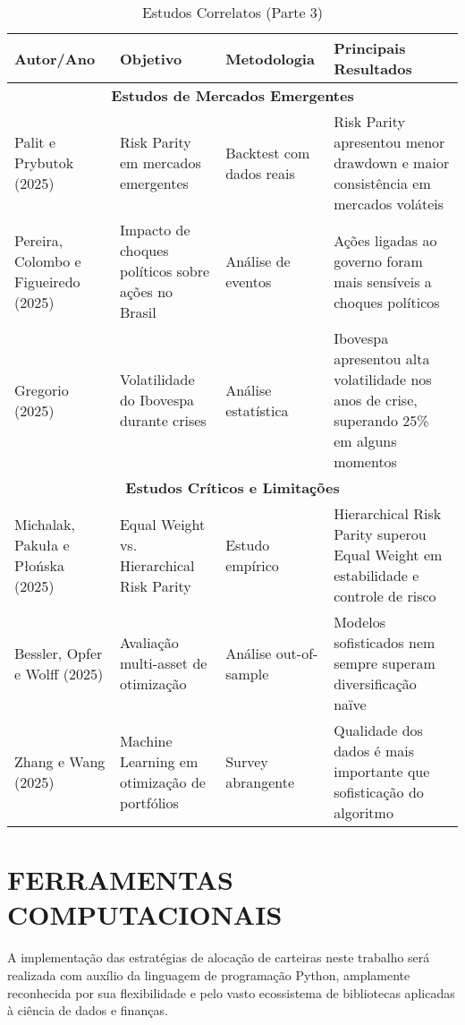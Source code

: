 \begin{table}[H]
\centering
\caption{Estudos Correlatos (Parte 3)}
\begin{tabular}{|p{2.3cm}|p{3.2cm}|p{2.6cm}|p{3.2cm}|}
\hline
\textbf{Autor/Ano} & \textbf{Objetivo} & \textbf{Metodologia} & \textbf{Principais Resultados} \\
\hline
\multicolumn{4}{|c|}{\textbf{Estudos de Mercados Emergentes}} \\
\hline
Palit e Prybutok (2025) & Risk Parity em mercados emergentes & Backtest com dados reais & Risk Parity apresentou menor drawdown e maior consistência em mercados voláteis \\
\hline
Pereira, Colombo e Figueiredo (2025) & Impacto de choques políticos sobre ações no Brasil & Análise de eventos & Ações ligadas ao governo foram mais sensíveis a choques políticos \\
\hline
Gregorio (2025) & Volatilidade do Ibovespa durante crises & Análise estatística & Ibovespa apresentou alta volatilidade nos anos de crise, superando 25\% em alguns momentos \\
\hline
\multicolumn{4}{|c|}{\textbf{Estudos Críticos e Limitações}} \\
\hline
Michalak, Pakuła e Płońska (2025) & Equal Weight vs. Hierarchical Risk Parity & Estudo empírico & Hierarchical Risk Parity superou Equal Weight em estabilidade e controle de risco \\
\hline
Bessler, Opfer e Wolff (2025) & Avaliação multi-asset de otimização & Análise out-of-sample & Modelos sofisticados nem sempre superam diversificação naïve \\
\hline
Zhang e Wang (2025) & Machine Learning em otimização de portfólios & Survey abrangente & Qualidade dos dados é mais importante que sofisticação do algoritmo \\
\hline
\end{tabular}
\label{tab:estudos_correlatos_3}
\end{table}

\section{FERRAMENTAS COMPUTACIONAIS}

A implementação das estratégias de alocação de carteiras neste trabalho será realizada com auxílio da linguagem de programação Python, amplamente reconhecida por sua flexibilidade e pelo vasto ecossistema de bibliotecas aplicadas à ciência de dados e finanças.

